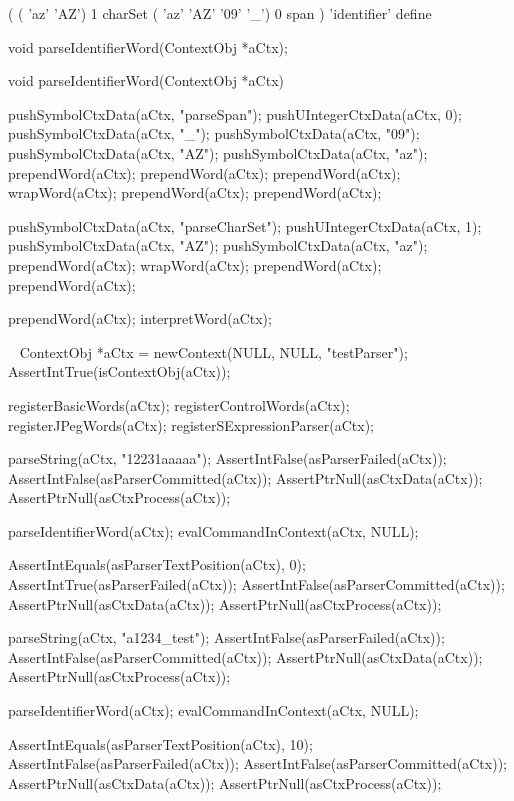 \starttyping
(
  ( 'az' 'AZ') 1 charSet
  ( 'az' 'AZ' '09' '_') 0 span
) 'identifier' define
\stoptyping

\startCHeader
void parseIdentifierWord(ContextObj *aCtx);
\stopCHeader

\startCCode
void parseIdentifierWord(ContextObj *aCtx) {
  pushSymbolCtxData(aCtx, "parseSpan");
  pushUIntegerCtxData(aCtx, 0);
  pushSymbolCtxData(aCtx, "_");
  pushSymbolCtxData(aCtx, "09");
  pushSymbolCtxData(aCtx, "AZ");
  pushSymbolCtxData(aCtx, "az");
  prependWord(aCtx);
  prependWord(aCtx);
  prependWord(aCtx);
  wrapWord(aCtx);
  prependWord(aCtx);
  prependWord(aCtx);

  pushSymbolCtxData(aCtx, "parseCharSet");
  pushUIntegerCtxData(aCtx, 1);
  pushSymbolCtxData(aCtx, "AZ");
  pushSymbolCtxData(aCtx, "az");
  prependWord(aCtx);
  wrapWord(aCtx);
  prependWord(aCtx);
  prependWord(aCtx);
  
  prependWord(aCtx);
  interpretWord(aCtx);
}
\stopCCode

\CTestsSuiteSetup\
\startCTest
  ContextObj *aCtx = newContext(NULL, NULL, "testParser");
  AssertIntTrue(isContextObj(aCtx));
  
  registerBasicWords(aCtx);
  registerControlWords(aCtx);
  registerJPegWords(aCtx);
  registerSExpressionParser(aCtx);
\stopCTest

\startCTest
  parseString(aCtx, "12231aaaaa");
  AssertIntFalse(asParserFailed(aCtx));
  AssertIntFalse(asParserCommitted(aCtx));
  AssertPtrNull(asCtxData(aCtx));
  AssertPtrNull(asCtxProcess(aCtx));
  
  parseIdentifierWord(aCtx);
  evalCommandInContext(aCtx, NULL);
  
  AssertIntEquals(asParserTextPosition(aCtx), 0);
  AssertIntTrue(asParserFailed(aCtx));
  AssertIntFalse(asParserCommitted(aCtx));
  AssertPtrNull(asCtxData(aCtx));
  AssertPtrNull(asCtxProcess(aCtx));
\stopCTest
\stopTestCase

\startCTest
  parseString(aCtx, "a1234_test");
  AssertIntFalse(asParserFailed(aCtx));
  AssertIntFalse(asParserCommitted(aCtx));
  AssertPtrNull(asCtxData(aCtx));
  AssertPtrNull(asCtxProcess(aCtx));
  
  parseIdentifierWord(aCtx);
  evalCommandInContext(aCtx, NULL);
  
  AssertIntEquals(asParserTextPosition(aCtx), 10);
  AssertIntFalse(asParserFailed(aCtx));
  AssertIntFalse(asParserCommitted(aCtx));
  AssertPtrNull(asCtxData(aCtx));
  AssertPtrNull(asCtxProcess(aCtx));
\stopCTest
\stopTestCase
\stopTestSuite

